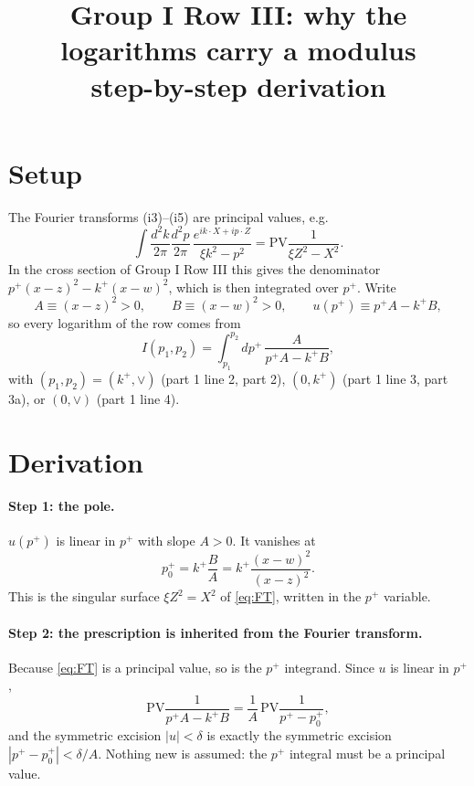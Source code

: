 \documentclass[11pt]{article}
\title{Group I Row III: why the logarithms carry a modulus\\[2pt]\large step-by-step derivation}
\date{}
\numberwithin{equation}{section}
\newcommand{\PV}{\mathrm{PV}}
\begin{document}
\maketitle

\section{Setup}
The Fourier transforms (i3)--(i5) are principal values, e.g.
\begin{equation}
\int\frac{d^2k}{2\pi}\frac{d^2p}{2\pi}\,\frac{e^{ik\cdot X+ip\cdot Z}}{\xi k^2-p^2}=\PV\frac{1}{\xi Z^2-X^2}.\label{eq:FT}
\end{equation}
In the cross section of Group I Row III this gives the denominator $p^+(x-z)^2-k^+(x-w)^2$, which is then integrated over $p^+$. Write
\begin{equation}
A\equiv(x-z)^2>0,\qquad B\equiv(x-w)^2>0,\qquad u(p^+)\equiv p^+A-k^+B,
\end{equation}
so every logarithm of the row comes from
\begin{equation}
I(p_1,p_2)=\int_{p_1}^{p_2}dp^+\,\frac{A}{p^+A-k^+B},\label{eq:I}
\end{equation}
with $(p_1,p_2)=(k^+,\vee)$ (part 1 line 2, part 2), $(0,k^+)$ (part 1 line 3, part 3a), or $(0,\vee)$ (part 1 line 4).

\section{Derivation}
\paragraph{Step 1: the pole.} $u(p^+)$ is linear in $p^+$ with slope $A>0$. It vanishes at
\begin{equation}
p_0^+=k^+\frac{B}{A}=k^+\frac{(x-w)^2}{(x-z)^2}.
\end{equation}
This is the singular surface $\xi Z^2=X^2$ of \eqref{eq:FT}, written in the $p^+$ variable.

\paragraph{Step 2: the prescription is inherited from the Fourier transform.} Because \eqref{eq:FT} is a principal value, so is the $p^+$ integrand. Since $u$ is linear in $p^+$,
\begin{equation}
\PV\frac{1}{p^+A-k^+B}=\frac{1}{A}\,\PV\frac{1}{p^+-p_0^+},
\end{equation}
and the symmetric excision $|u|<\delta$ is exactly the symmetric excision $|p^+-p_0^+|<\delta/A$. Nothing new is assumed: the $p^+$ integral must be a principal value.
\end{document}
